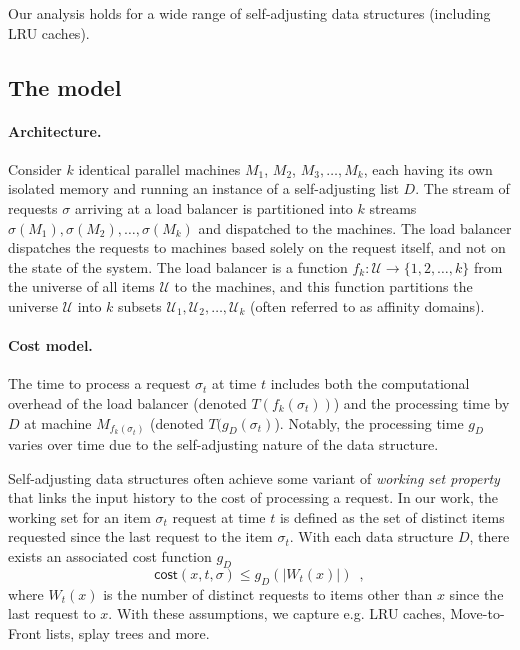 Our analysis holds for a wide range of self-adjusting data structures (including LRU caches).

\subsection{The model}
\label{sec:app:model}

\paragraph{Architecture.}

Consider $k$ identical parallel machines $M_1$, $M_2$, $M_3, \ldots, M_k$, each having its own isolated memory and running an instance of a self-adjusting list $D$.
The stream of requests $\sigma$ arriving at a load balancer is partitioned into $k$ streams $\sigma(M_1), \sigma(M_2), \ldots, \sigma(M_k)$ and dispatched to the machines.
The load balancer dispatches the requests to machines based solely on the request itself, and not on the state of the system.
The load balancer is a function $f_k : \mathcal{U} \to \{1, 2, \ldots, k\}$ from the universe of all items $\mathcal{U}$ to the machines, and this function partitions the universe $\mathcal{U}$ into $k$ subsets $\mathcal{U}_1, \mathcal{U}_2, \ldots, \mathcal{U}_k$ (often referred to as affinity domains).

\paragraph{Cost model.}

The time to process a request $\sigma_t$ at time $t$ includes both the computational overhead of the load balancer (denoted $T(f_k(\sigma_t))$) and the processing time by $D$ at machine $M_{f_k(\sigma_t)}$ (denoted $T(g_D(\sigma_t)$).
Notably, the processing time $g_D$ varies over time due to the self-adjusting nature of the data structure.

Self-adjusting data structures often achieve some variant of \emph{working set property} that links the input history to the cost of processing a request.
In our work, the working set for an item $\sigma_t$ request at time $t$ is defined as the set of distinct items requested since the last request to the item $\sigma_t$.
With each data structure $D$, there exists an associated cost function $g_D$ 
\[
	\textsf{cost}(x, t, \sigma) \le g_D(|W_t(x)|) \enspace ,
\]
where $W_t(x)$ is the number of distinct requests to items other than $x$ since the last request to $x$.
With these assumptions, we capture e.g. LRU caches, Move-to-Front lists, splay trees and more. 




